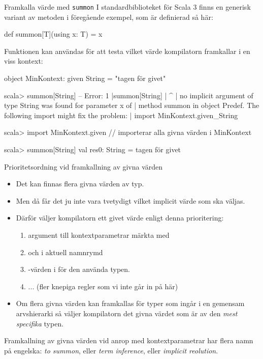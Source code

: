 \begin{Slide}{Framkalla värde med \texttt{summon}}\SlideFontSmall
I standardbiblioteket för Scala 3 finns en generisk variant av metoden  i föregående exempel, som är definierad så här:
\begin{Code}
def summon[T](using x: T) = x 
\end{Code}
Funktionen  kan användas för att testa vilket värde kompilatorn framkallar i en viss kontext:
\begin{Code}
object MinKontext:
  given String = "tagen för givet"
\end{Code}
\vspace{-0.9em}
\begin{REPLsmall}
scala> summon[String]
-- Error:
1 |summon[String]
  |              ^
  | no implicit argument of type String was found for parameter x of 
  | method summon in object Predef. The following import might fix the problem:
  | import MinKontext.given_String

scala> import MinKontext.given    // importerar alla givna värden i MinKontext

scala> summon[String]
val res0: String = tagen för givet
\end{REPLsmall}
\end{Slide}

\begin{Slide}{Prioritetsordning vid framkallning av givna värden}\SlideFontSmall
\begin{itemize}\SlideFontSmall
\item Det kan finnas flera  givna värden av  typ.
\item Men då får det ju inte vara tvetydigt vilket implicit värde som ska väljas.
\item Därför väljer kompilatorn ett givet värde enligt denna prioritering:
\begin{enumerate}\SlideFontTiny
\item {} argument till kontextparametrar märkta med 
\item {} och  i aktuell namnrymd  
\item {}-värden i  för den använda typen.
\item ... (fler knepiga regler som vi inte går in på här)
\end{enumerate}
\item Om flera givna värden kan framkallas för typer som ingår i en gemensam arvshierarki så väljer kompilatorn det givna värdet som är av den \emph{mest specifika} typen.
\end{itemize}
Framkallning av givna värden vid anrop med kontextparametrar har flera namn på engelska: \emph{to summon}, eller \emph{term inference}, eller \emph{implicit reolution}. 
\end{Slide}

